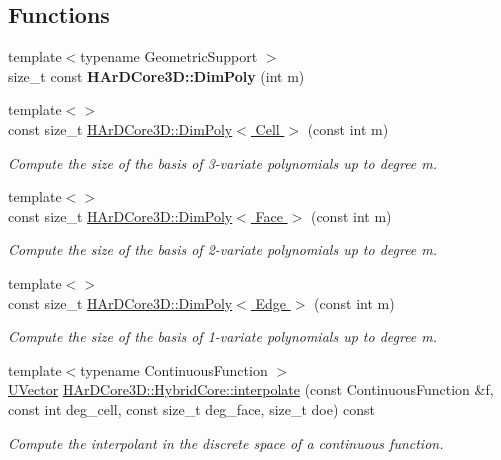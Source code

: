 \subsection*{Functions}
\begin{DoxyCompactItemize}
\item 
\mbox{\label{group__HybridCore_ga004d7d872877eb4945aac682ab1c8331}} 
{\footnotesize template$<$typename Geometric\+Support $>$ }\\size\+\_\+t const {\bfseries H\+Ar\+D\+Core3\+D\+::\+Dim\+Poly} (int m)
\item 
{\footnotesize template$<$$>$ }\\const size\+\_\+t \hyperlink{group__HybridCore_gac24ef7d804b2e6401b814a9cb51dc38c}{H\+Ar\+D\+Core3\+D\+::\+Dim\+Poly$<$ Cell $>$} (const int m)
\begin{DoxyCompactList}\small\item\em Compute the size of the basis of 3-\/variate polynomials up to degree m. \end{DoxyCompactList}\item 
{\footnotesize template$<$$>$ }\\const size\+\_\+t \hyperlink{group__HybridCore_ga54992ff646d6a458520e588efa649cc6}{H\+Ar\+D\+Core3\+D\+::\+Dim\+Poly$<$ Face $>$} (const int m)
\begin{DoxyCompactList}\small\item\em Compute the size of the basis of 2-\/variate polynomials up to degree m. \end{DoxyCompactList}\item 
{\footnotesize template$<$$>$ }\\const size\+\_\+t \hyperlink{group__HybridCore_gacd3736783277672d9dd3ed154727f3bf}{H\+Ar\+D\+Core3\+D\+::\+Dim\+Poly$<$ Edge $>$} (const int m)
\begin{DoxyCompactList}\small\item\em Compute the size of the basis of 1-\/variate polynomials up to degree m. \end{DoxyCompactList}\item 
{\footnotesize template$<$typename Continuous\+Function $>$ }\\\hyperlink{classHArDCore3D_1_1UVector}{U\+Vector} \hyperlink{group__HybridCore_gadce852531f9197a35e11e1bf9995e827}{H\+Ar\+D\+Core3\+D\+::\+Hybrid\+Core\+::interpolate} (const Continuous\+Function \&f, const int deg\+\_\+cell, const size\+\_\+t deg\+\_\+face, size\+\_\+t doe) const
\begin{DoxyCompactList}\small\item\em Compute the interpolant in the discrete space of a continuous function. \end{DoxyCompactList}\end{DoxyCompactItemize}


